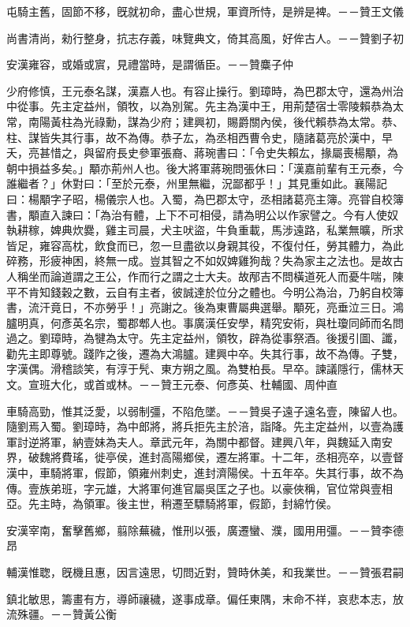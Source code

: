 \begin{pinyinscope}
屯騎主舊，固節不移，旣就初命，盡心世規，軍資所恃，是辨是裨。－－贊王文儀

尚書清尚，勑行整身，抗志存義，味覽典文，倚其高風，好侔古人。－－贊劉子初

安漢雍容，或婚或賔，見禮當時，是謂循臣。－－贊麋子仲

少府修慎，王元泰名謀，漢嘉人也。有容止操行。劉璋時，為巴郡太守，還為州治中從事。先主定益州，領牧，以為別駕。先主為漢中王，用荊楚宿士零陵賴恭為太常，南陽黃柱為光祿勳，謀為少府；建興初，賜爵關內侯，後代賴恭為太常。恭、柱、謀皆失其行事，故不為傳。恭子厷，為丞相西曹令史，隨諸葛亮於漢中，早夭，亮甚惜之，與留府長史參軍張裔、蔣琬書曰：「令史失賴厷，掾屬喪楊顒，為朝中損益多矣。」顒亦荊州人也。後大將軍蔣琬問張休曰：「漢嘉前輩有王元泰，今誰繼者？」休對曰：「至於元泰，州里無繼，況鄙都乎！」其見重如此。襄陽記曰：楊顒字子昭，楊儀宗人也。入蜀，為巴郡太守，丞相諸葛亮主簿。亮甞自校簿書，顒直入諫曰：「為治有體，上下不可相侵，請為明公以作家譬之。今有人使奴執耕稼，婢典炊爨，雞主司晨，犬主吠盜，牛負重載，馬涉遠路，私業無曠，所求皆足，雍容高枕，飲食而已，忽一旦盡欲以身親其役，不復付任，勞其體力，為此碎務，形疲神困，終無一成。豈其智之不如奴婢雞狗哉？失為家主之法也。是故古人稱坐而論道謂之王公，作而行之謂之士大夫。故邴吉不問橫道死人而憂牛喘，陳平不肯知錢穀之數，云自有主者，彼誠達於位分之體也。今明公為治，乃躬自校簿書，流汗竟日，不亦勞乎！」亮謝之。後為東曹屬典選舉。顒死，亮垂泣三日。鴻臚明真，何彥英名宗，蜀郡郫人也。事廣漢任安學，精究安術，與杜瓊同師而名問過之。劉璋時，為犍為太守。先主定益州，領牧，辟為從事祭酒。後援引圖、讖，勸先主即尊號。踐阼之後，遷為大鴻臚。建興中卒。失其行事，故不為傳。子雙，字漢偶。滑稽談笑，有淳于髠、東方朔之風。為雙柏長。早卒。諫議隱行，儒林天文。宣班大化，或首或林。－－贊王元泰、何彥英、杜輔國、周仲直

車騎高勁，惟其泛愛，以弱制彊，不陷危墜。－－贊吳子遠子遠名壹，陳留人也。隨劉焉入蜀。劉璋時，為中郎將，將兵拒先主於涪，詣降。先主定益州，以壹為護軍討逆將軍，納壹妹為夫人。章武元年，為關中都督。建興八年，與魏延入南安界，破魏將費瑤，徙亭侯，進封高陽鄉侯，遷左將軍。十二年，丞相亮卒，以壹督漢中，車騎將軍，假節，領雍州刺史，進封濟陽侯。十五年卒。失其行事，故不為傳。壹族弟班，字元雄，大將軍何進官屬吳匡之子也。以豪俠稱，官位常與壹相亞。先主時，為領軍。後主世，稍遷至驃騎將軍，假節，封綿竹侯。

安漢宰南，奮擊舊鄉，翦除蕪穢，惟刑以張，廣遷蠻、濮，國用用彊。－－贊李德昂

輔漢惟聦，旣機且惠，因言遠思，切問近對，贊時休美，和我業世。－－贊張君嗣

鎮北敏思，籌畫有方，導師禳穢，遂事成章。偏任東隅，末命不祥，哀悲本志，放流殊疆。－－贊黃公衡


\end{pinyinscope}
